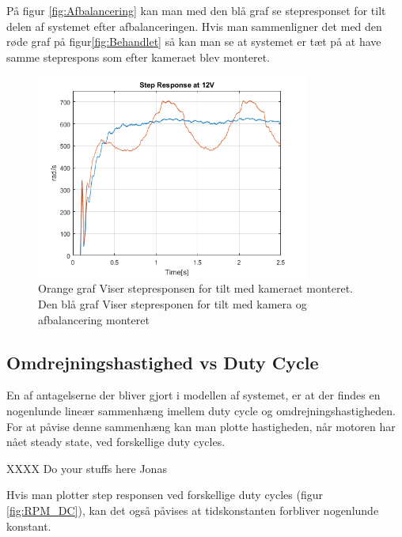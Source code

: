 På figur \ref{fig:Afbalancering} kan man med den blå graf se stepresponset for tilt delen af systemet efter afbalanceringen. Hvis man sammenligner det med den røde graf på figur\ref{fig:Behandlet} så kan man se at systemet er tæt på at have samme steprespons som efter kameraet blev monteret.\\


\begin{figure}[!hb]
	\begin{center}
		\includegraphics[width=0.8\textwidth]{Billeder/balanced_vs_unbalanced.png}
	\end{center}
	\caption{Orange graf Viser stepresponsen for tilt med kameraet monteret. Den blå graf Viser stepresponen for tilt med kamera og afbalancering monteret}
	\label{fig:Balanced_Response}
\end{figure}

\subsection{Omdrejningshastighed vs Duty Cycle}

En af antagelserne der bliver gjort i modellen af systemet, er at der findes en nogenlunde lineær sammenhæng imellem duty cycle og omdrejningshastigheden. For at påvise denne sammenhæng kan man plotte hastigheden, når motoren har nået steady state, ved forskellige duty cycles. 

XXXX Do your stuffs here Jonas

Hvis man plotter step responsen ved forskellige duty cycles (figur \ref{fig:RPM_DC}), kan det også påvises at tidskonstanten forbliver nogenlunde konstant. 

